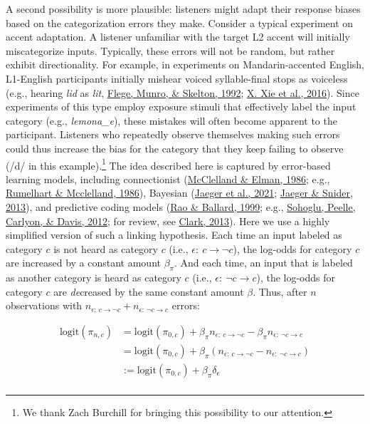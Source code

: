 \documentclass[
  11pt,
  man,floatsintext]{apa6}
\begin{document}
A second possibility is more plausible: listeners might adapt their response biases based on the categorization errors they make. Consider a typical experiment on accent adaptation. A listener unfamiliar with the target L2 accent will initially miscategorize inputs. Typically, these errors will not be random, but rather exhibit directionality. For example, in experiments on Mandarin-accented English, L1-English participants initially mishear voiced syllable-final stops as voiceless (e.g., hearing \emph{lid} as \emph{lit}, \protect\hyperlink{ref-flege1992}{Flege, Munro, \& Skelton, 1992}; \protect\hyperlink{ref-xie2016jep}{X. Xie et al., 2016}). Since experiments of this type employ exposure stimuli that effectively label the input category (e.g., \emph{lemona\_e}), these mistakes will often become apparent to the participant. Listeners who repeatedly observe themselves making such errors could thus increase the bias for the category that they keep failing to observe (/d/ in this example).\footnote{We thank Zach Burchill for bringing this possibility to our attention.} The idea described here is captured by error-based learning models, including connectionist (\protect\hyperlink{ref-mcclelland-elman1986}{McClelland \& Elman, 1986}; e.g., \protect\hyperlink{ref-rumelhart-mcclelland1986}{Rumelhart \& Mcclelland, 1986}), Bayesian (\protect\hyperlink{ref-jaeger2019}{Jaeger et al., 2021}; \protect\hyperlink{ref-jaeger-snider2013}{Jaeger \& Snider, 2013}), and predictive coding models (\protect\hyperlink{ref-rao-ballard1999}{Rao \& Ballard, 1999}; e.g., \protect\hyperlink{ref-sohoglu2012}{Sohoglu, Peelle, Carlyon, \& Davis, 2012}; for review, see \protect\hyperlink{ref-clark2013}{Clark, 2013}). Here we use a highly simplified version of such a linking hypothesis. Each time an input labeled as category \(c\) is not heard as category \(c\) (i.e., \(\epsilon\mathrm{:}\ c \rightarrow \neg c\)), the log-odds for category \(c\) are increased by a constant amount \(\beta_{\pi}\). And each time, an input that is labeled as another category is heard as category \(c\) (i.e., \(\epsilon\mathrm{:}\ \neg c \rightarrow c\)), the log-odds for category \(c\) are \emph{de}creased by the same constant amount \(\beta\). Thus, after \(n\) observations with \(n_{\epsilon\mathrm{:}\ c \rightarrow \neg c} + n_{\epsilon\mathrm{:}\ \neg c \rightarrow c}\) errors:

\begin{equation}\label{eq:bias-updating}
\begin{split}
\mathrm{logit}(\pi_{n,c}) & = \mathrm{logit}(\pi_{0,c}) + \beta_{\pi} n_{\epsilon\mathrm{:}\ c \rightarrow \neg c} - \beta_{\pi} n_{\epsilon\mathrm{:}\ \neg c \rightarrow c} \\
                          & = \mathrm{logit}(\pi_{0,c}) + \beta_{\pi} (n_{\epsilon\mathrm{:}\ c \rightarrow \neg c} - n_{\epsilon\mathrm{:}\ \neg c \rightarrow c}) \\
                          & := \mathrm{logit}(\pi_{0,c}) + \beta_{\pi} \delta_{\epsilon} \\
\end{split}
\end{equation}
\end{document}
